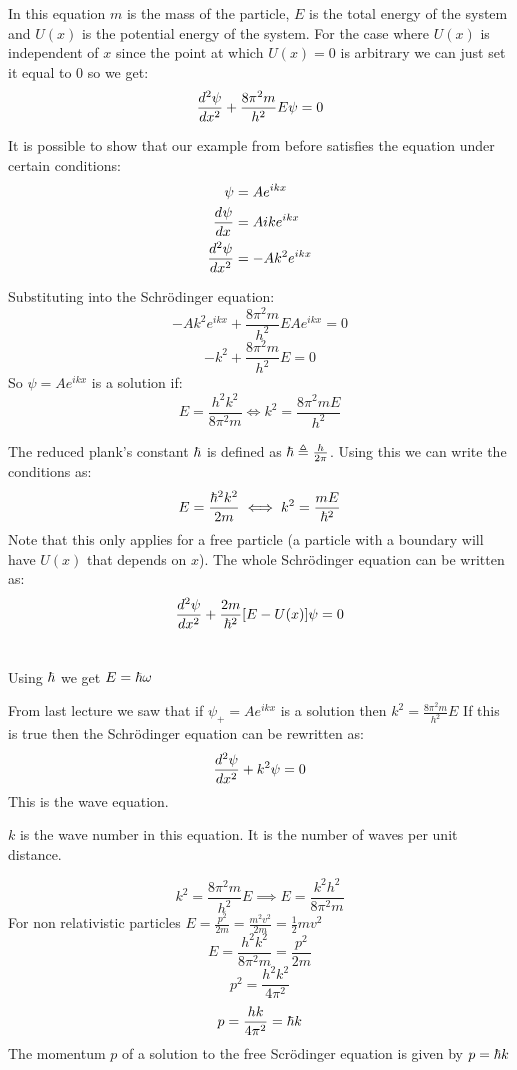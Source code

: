 \begin{center}
\end{center}

In this equation \(m\) is the mass of the particle, \(E\) is the total energy of the system and \(U(x)\) is the potential energy of the system. For the case where \(U(x)\) is independent of \(x\) since the point at which \(U(x)=0\) is arbitrary we can just set it equal to 0 so we get:
\[\dv[2]{\psi}{x}+\frac{8\pi^2m}{h^2}E\psi=0\]

It is possible to show that our example from before satisfies the equation under certain conditions:
\begin{align*}
\psi&=Ae^{ikx}\\
\dv{\psi}{x}&=Aike^{ikx}\\
\dv[2]{\psi}{x}&=-Ak^2e^{ikx}
\end{align*}

Substituting into the Schr\"odinger equation:
\[-Ak^2e^{ikx}+\frac{8\pi^2m}{h^2}EAe^{ikx}=0\]
\[-k^2+\frac{8\pi^2m}{h^2}E=0\]
So \(\psi=Ae^{ikx}\) is a solution if:
\[E=\frac{h^2k^2}{8\pi^2m}\iff k^2=\frac{8\pi^2mE}{h^2}\]

The reduced plank's constant \(\hb\) is defined as \(\hb\triangleq\frac{h}{2\pi}\). Using this we can write the conditions as:
\[E=\frac{\hb^2k^2}{2m}\iff k^2=\frac{mE}{\hb^2}\]
Note that this only applies for a free particle (a particle with a boundary will have \(U(x)\) that depends on \(x\)). The whole Schr\"odinger equation can be written as:
\[\dv[2]{\psi}{x}+\frac{2m}{\hb^2}[E-U(x)]\psi=0\]


\section{}

Using \(\hb\) we get \(E=\hb\omega\)

From last lecture we saw that if \(\psi_+=Ae^{ikx}\) is a solution then \(k^2=\frac{8\pi^2m}{h^2}E\) If this is true then the Schr\"odinger equation can be rewritten as:
\[\dv[2]{\psi}{x}+k^2\psi=0\]
This is the wave equation.

\(k\) is the wave number in this equation. It is the number of waves per unit distance.

\[k^2=\frac{8\pi^2m}{h^2}E\implies E=\frac{k^2h^2}{8\pi^2m}\]
For non relativistic particles \(E=\frac{p^2}{2m}=\frac{m^2v^2}{2m}=\frac12mv^2\)
\[E=\frac{h^2k^2}{8\pi^2m}=\frac{p^2}{2m}\]
\[p^2=\frac{h^2k^2}{4\pi^2}\]
\[p=\frac{hk}{4\pi^2}=\hb k\]
The momentum \(p\) of a solution to the free Scr\"odinger equation is given by \(p=\hb k\)

